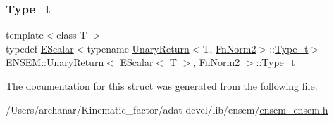 \mbox{\label{structENSEM_1_1UnaryReturn_3_01EScalar_3_01T_01_4_00_01FnNorm2_01_4_acb54ade58c6e4e3f443f349d5ddb92e1}} 
\subsubsection{\texorpdfstring{Type\_t}{Type\_t}\hspace{0.1cm}{\footnotesize\ttfamily [3/3]}}
{\footnotesize\ttfamily template$<$class T $>$ \\
typedef \mbox{\hyperlink{classENSEM_1_1EScalar}{E\+Scalar}}$<$typename \mbox{\hyperlink{structENSEM_1_1UnaryReturn}{Unary\+Return}}$<$T, \mbox{\hyperlink{structENSEM_1_1FnNorm2}{Fn\+Norm2}}$>$\+::\mbox{\hyperlink{structENSEM_1_1UnaryReturn_3_01EScalar_3_01T_01_4_00_01FnNorm2_01_4_acb54ade58c6e4e3f443f349d5ddb92e1}{Type\+\_\+t}}$>$ \mbox{\hyperlink{structENSEM_1_1UnaryReturn}{E\+N\+S\+E\+M\+::\+Unary\+Return}}$<$ \mbox{\hyperlink{classENSEM_1_1EScalar}{E\+Scalar}}$<$ T $>$, \mbox{\hyperlink{structENSEM_1_1FnNorm2}{Fn\+Norm2}} $>$\+::\mbox{\hyperlink{structENSEM_1_1UnaryReturn_3_01EScalar_3_01T_01_4_00_01FnNorm2_01_4_acb54ade58c6e4e3f443f349d5ddb92e1}{Type\+\_\+t}}}



The documentation for this struct was generated from the following file\+:\begin{DoxyCompactItemize}
\item 
/\+Users/archanar/\+Kinematic\+\_\+factor/adat-\/devel/lib/ensem/\mbox{\hyperlink{adat-devel_2lib_2ensem_2ensem__ensem_8h}{ensem\+\_\+ensem.\+h}}\end{DoxyCompactItemize}
